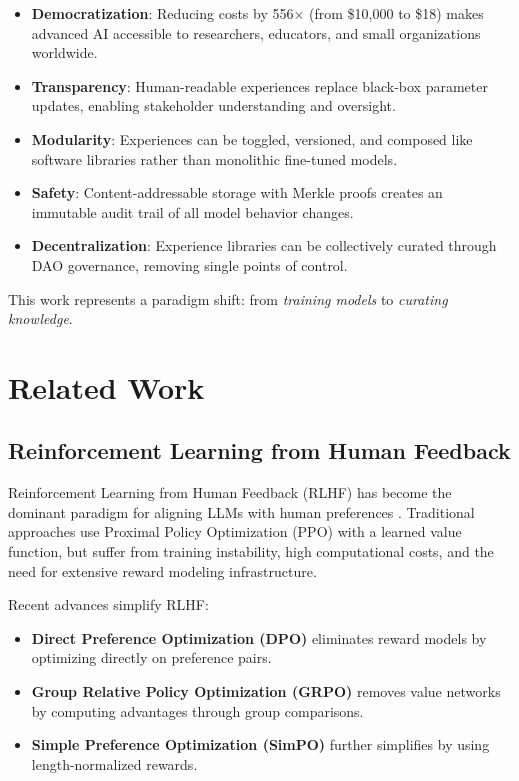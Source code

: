 \documentclass[11pt,a4paper]{article}
\begin{document}
\begin{itemize}
    \item \textbf{Democratization}: Reducing costs by 556× (from \$10,000 to \$18) makes advanced AI accessible to researchers, educators, and small organizations worldwide.

    \item \textbf{Transparency}: Human-readable experiences replace black-box parameter updates, enabling stakeholder understanding and oversight.

    \item \textbf{Modularity}: Experiences can be toggled, versioned, and composed like software libraries rather than monolithic fine-tuned models.

    \item \textbf{Safety}: Content-addressable storage with Merkle proofs creates an immutable audit trail of all model behavior changes.

    \item \textbf{Decentralization}: Experience libraries can be collectively curated through DAO governance, removing single points of control.
\end{itemize}

This work represents a paradigm shift: from \textit{training models} to \textit{curating knowledge}.

\section{Related Work}

\subsection{Reinforcement Learning from Human Feedback}

Reinforcement Learning from Human Feedback (RLHF) has become the dominant paradigm for aligning LLMs with human preferences \cite{ouyang2022training,bai2022constitutional}. Traditional approaches use Proximal Policy Optimization (PPO) \cite{schulman2017proximal} with a learned value function, but suffer from training instability, high computational costs, and the need for extensive reward modeling infrastructure.

Recent advances simplify RLHF:
\begin{itemize}
    \item \textbf{Direct Preference Optimization (DPO)} \cite{rafailov2023direct} eliminates reward models by optimizing directly on preference pairs.
    \item \textbf{Group Relative Policy Optimization (GRPO)} \cite{shao2024deepseekmath} removes value networks by computing advantages through group comparisons.
    \item \textbf{Simple Preference Optimization (SimPO)} \cite{meng2024simpo} further simplifies by using length-normalized rewards.
\end{itemize}
\end{document}
